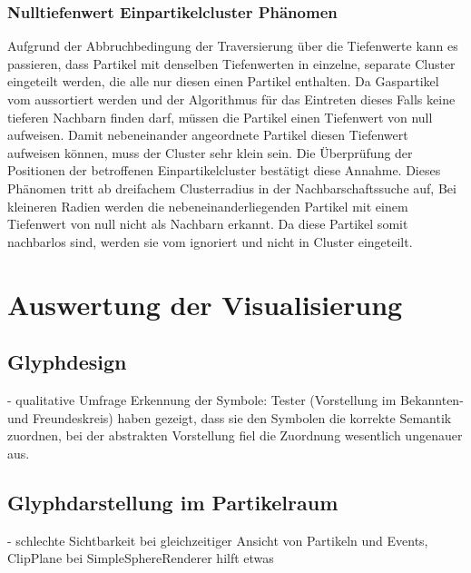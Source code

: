 \subsubsection*{Nulltiefenwert Einpartikelcluster Phänomen} %

Aufgrund der Abbruchbedingung der Traversierung über die Tiefenwerte kann es passieren, dass Partikel mit denselben Tiefenwerten in einzelne, separate Cluster eingeteilt werden, die alle nur diesen einen Partikel enthalten. Da Gaspartikel vom  aussortiert werden und der Algorithmus für das Eintreten dieses Falls keine tieferen Nachbarn finden darf, müssen die Partikel einen Tiefenwert von null aufweisen. Damit nebeneinander angeordnete Partikel diesen Tiefenwert aufweisen können, muss der Cluster sehr klein sein. %
Die Überprüfung der Positionen der betroffenen Einpartikelcluster bestätigt diese Annahme. %
Dieses Phänomen tritt ab dreifachem Clusterradius in der Nachbarschaftssuche auf, Bei kleineren Radien werden die nebeneinanderliegenden Partikel mit einem Tiefenwert von null nicht als Nachbarn erkannt. Da diese Partikel somit nachbarlos sind, werden sie vom  ignoriert und nicht in Cluster eingeteilt.

\section{Auswertung der Visualisierung}

\subsection{Glyphdesign}
- qualitative Umfrage Erkennung der Symbole: Tester (Vorstellung im Bekannten- und Freundeskreis) haben gezeigt, dass sie den Symbolen die korrekte Semantik zuordnen, bei der abstrakten Vorstellung fiel die Zuordnung wesentlich ungenauer aus. %

\subsection{Glyphdarstellung im Partikelraum}

- schlechte Sichtbarkeit bei gleichzeitiger Ansicht von Partikeln und Events, ClipPlane bei SimpleSphereRenderer hilft etwas %

